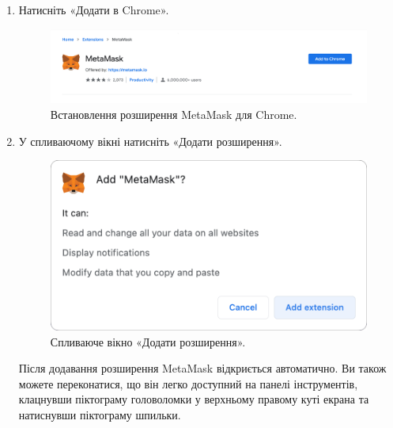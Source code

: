 \begin{enumerate}
    \item Натисніть «Додати в Chrome».

    \begin{figure}[ht]
        \centering
        \includegraphics[scale=0.4]{IMAGES/metamask3.png}
        \caption{Встановлення розширення MetaMask для Chrome.}
        \label{fig_sudak}
    \end{figure}

    \newpage
    \item У спливаючому вікні натисніть «Додати розширення».
    
    \begin{figure}[ht]
            \centering
            \includegraphics[scale=0.5]{IMAGES/metamask4.png}
            \caption{Спливаюче вікно «Додати розширення».}
            \label{fig_pacman}
    \end{figure}

    Після додавання розширення MetaMask відкриється автоматично. Ви також можете переконатися, що він легко доступний на панелі інструментів, клацнувши піктограму головоломки у верхньому правому куті екрана та натиснувши піктограму шпильки.  


\end{enumerate}
